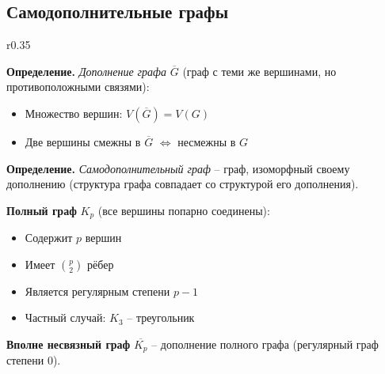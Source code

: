 \subsection{Самодополнительные графы}

\begin{wrapfigure}{r}{0.35\textwidth}
\end{wrapfigure}

\noindent\textbf{Определение.} \textit{Дополнение графа} $\overline{G}$ (граф с теми же вершинами, но противоположными связями):
\begin{itemize}[noitemsep,topsep=0pt]
\item Множество вершин: $V(\overline{G}) = V(G)$
\item Две вершины смежны в $\overline{G}$ $\Leftrightarrow$ несмежны в $G$
\end{itemize}

\noindent\textbf{Определение.} \textit{Самодополнительный граф} -- граф, изоморфный своему дополнению (структура графа совпадает со структурой его дополнения).

\noindent\textbf{Полный граф} $K_p$ (все вершины попарно соединены):
\begin{itemize}[noitemsep,topsep=0pt]
\item Содержит $p$ вершин
\item Имеет $\binom{p}{2}$ рёбер
\item Является регулярным степени $p-1$
\item Частный случай: $K_3$ -- треугольник
\end{itemize}

\noindent\textbf{Вполне несвязный граф} $\overline{K_p}$ -- дополнение полного графа (регулярный граф степени 0).